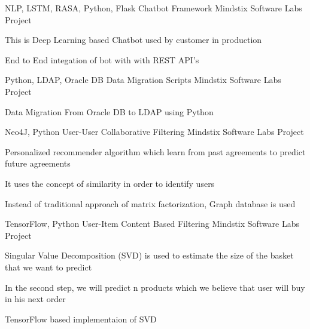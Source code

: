 \begin{cventries}
    \cventry
    {NLP, LSTM, RASA, Python, Flask} %
    {Chatbot Framework} %
    {Mindstix Software Labs Project} %
    {} %
    {
      \begin{cvitems} %
        \item {This is Deep Learning based Chatbot used by customer in production}
        \item {End to End integation of bot with with REST API's }
      \end{cvitems}
    }
    
    \cventry
    {Python, LDAP, Oracle DB} %
    {Data Migration Scripts} %
    {Mindstix Software Labs Project} %
    {} %
    {
      \begin{cvitems} %
        \item {Data Migration From Oracle DB to LDAP using Python}
      \end{cvitems}
    }
  
   \cventry
    {Neo4J, Python} %
    {User-User Collaborative Filtering} %
    {Mindstix Software Labs Project} %
    {} %
    {
      \begin{cvitems} %
        \item {Personalized recommender algorithm which learn from past agreements to predict future agreements}
        \item {It uses the concept of similarity in order to identify users}
        \item {Instead of traditional approach of matrix factorization, Graph database is used}
      \end{cvitems}
    }
  
   \cventry
    {TensorFlow, Python} %
    {User-Item Content Based Filtering} %
    {Mindstix Software Labs Project} %
    {} %
    {
      \begin{cvitems} %
        \item {Singular Value Decomposition (SVD) is used to estimate the size of the basket that we want to predict}
        \item {In the second step, we will predict n products which we believe that user will buy in his next order}
        \item {TensorFlow based implementaion of SVD}
      \end{cvitems}
    }
   

\end{cventries}
